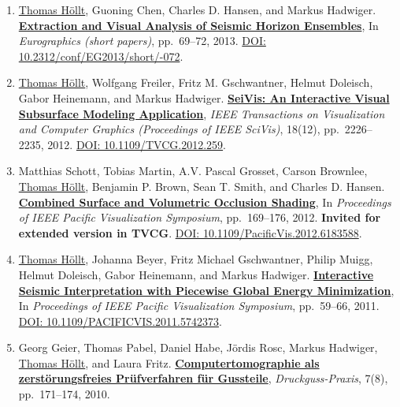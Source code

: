 \documentclass[10pt,a4paper,roman,final]{moderncv}
\newcommand*\highlightauthor[1]{\underline{#1}}
\begin{document}
\begin{enumerate}[leftmargin=0cm,start=2]
\item
\highlightauthor{Thomas Höllt}, Guoning Chen, Charles D. Hansen, and Markus Hadwiger.
\href{https://www.thomashollt.com/publications/2013_eurographics/}{\textbf{Extraction and Visual Analysis of Seismic Horizon Ensembles}},
In \emph{Eurographics (short papers)}, pp.~69--72,
2013.
\href{https://doi.org/10.2312/conf/EG2013/short/069-072}{DOI: 10.2312/\allowbreak conf/\allowbreak EG2013/\allowbreak short/-072}.


\item
\highlightauthor{Thomas Höllt}, Wolfgang Freiler, Fritz M. Gschwantner, Helmut Doleisch, Gabor Heinemann, and Markus Hadwiger.
\href{https://www.thomashollt.com/publications/2012_vis/}{\textbf{SeiVis: An Interactive Visual Subsurface Modeling Application}},
\emph{IEEE Transactions on Visualization and Computer Graphics (Proceedings of IEEE SciVis)}, 18(12), pp.~2226--2235,
2012.
\href{https://doi.org/10.1109/TVCG.2012.259}{DOI: 10.1109/\allowbreak TVCG.2012.259}.


\item
Matthias Schott, Tobias Martin, A.V. Pascal Grosset, Carson Brownlee, \highlightauthor{Thomas Höllt}, Benjamin P. Brown, Sean T. Smith, and Charles D. Hansen.
\href{https://www.thomashollt.com/publications/2012_schott_pacificvis/}{\textbf{Combined Surface and Volumetric Occlusion Shading}},
In \emph{Proceedings of IEEE Pacific Visualization Symposium}, pp.~169--176,
2012.
\textbf{Invited for extended version in TVCG}.
\href{https://doi.org/10.1109/PacificVis.2012.6183588}{DOI: 10.1109/\allowbreak PacificVis.2012.6183588}.


\item
\highlightauthor{Thomas Höllt}, Johanna Beyer, Fritz Michael Gschwantner, Philip Muigg, Helmut Doleisch, Gabor Heinemann, and Markus Hadwiger.
\href{https://www.thomashollt.com/publications/2011_pacificvis/}{\textbf{Interactive Seismic Interpretation with Piecewise Global Energy Minimization}},
In \emph{Proceedings of IEEE Pacific Visualization Symposium}, pp.~59--66,
2011.
\href{https://doi.org/10.1109/PACIFICVIS.2011.5742373}{DOI: 10.1109/\allowbreak PACIFICVIS.2011.5742373}.


\item
Georg Geier, Thomas Pabel, Daniel Habe, Jördis Rosc, Markus Hadwiger, \highlightauthor{Thomas Höllt}, and Laura Fritz.
\href{https://www.thomashollt.com/publications/2010_geier/}{\textbf{Computertomographie als zerstörungsfreies Prüfverfahren für Gussteile}},
\emph{Druckguss-Praxis}, 7(8), pp.~171--174,
2010.



\end{enumerate}
\end{document}
